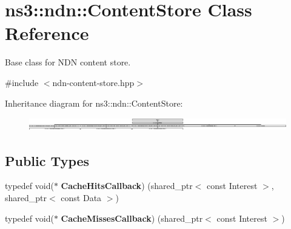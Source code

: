 \hypertarget{classns3_1_1ndn_1_1ContentStore}{}\section{ns3\+:\+:ndn\+:\+:Content\+Store Class Reference}
\label{classns3_1_1ndn_1_1ContentStore}


Base class for N\+DN content store.  




{\ttfamily \#include $<$ndn-\/content-\/store.\+hpp$>$}

Inheritance diagram for ns3\+:\+:ndn\+:\+:Content\+Store\+:\begin{figure}[H]
\begin{center}
\leavevmode
\includegraphics[height=0.596538cm]{classns3_1_1ndn_1_1ContentStore}
\end{center}
\end{figure}
\subsection*{Public Types}
\begin{DoxyCompactItemize}
\item 
typedef void($\ast$ {\bfseries Cache\+Hits\+Callback}) (shared\+\_\+ptr$<$ const Interest $>$, shared\+\_\+ptr$<$ const Data $>$)\hypertarget{classns3_1_1ndn_1_1ContentStore_a05ae2b188b68c42084ba64b99ddd3438}{}\label{classns3_1_1ndn_1_1ContentStore_a05ae2b188b68c42084ba64b99ddd3438}

\item 
typedef void($\ast$ {\bfseries Cache\+Misses\+Callback}) (shared\+\_\+ptr$<$ const Interest $>$)\hypertarget{classns3_1_1ndn_1_1ContentStore_ad4c8b09a75c7f2fd0a6fab0c01acff0d}{}\label{classns3_1_1ndn_1_1ContentStore_ad4c8b09a75c7f2fd0a6fab0c01acff0d}

\end{DoxyCompactItemize}
